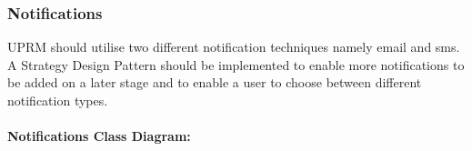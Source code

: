 \subsubsection{Notifications}
UPRM should utilise two different notification techniques namely email and sms. A Strategy Design Pattern should be implemented to enable more notifications to be added on a later stage and to enable a user to choose between different notification types.\\ \\
\textbf{Notifications Class Diagram:}\\
\centerline{}